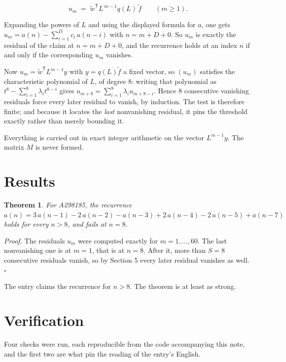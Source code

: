 \documentclass[11pt]{article}
\newtheorem{theorem}{Theorem}
\theoremstyle{definition}
\begin{document}
\[u_m \;=\; \tilde w^{\mathsf T} L^{\,m-1} q(L)\,\tilde f \qquad (m \ge 1).\]

Expanding the powers of $L$ and using the displayed formula for $a$, one gets $u_m = a(n) - \sum_{i=1}^{D} c_i\,a(n-i)$ with $n = m + D + 0$. So $u_m$ is exactly the residual of the claim at $n = m + D + 0$, and the recurrence holds at an index $n$ if and only if the corresponding $u_m$ vanishes.

Now $u_m = \tilde w^{\mathsf T} L^{m-1} y$ with $y = q(L)\tilde f$ a fixed vector, so $(u_m)$ satisfies the characteristic polynomial of $L$, of degree $8$: writing that polynomial as $t^{8} - \sum_{i=1}^{8} \lambda_i t^{8-i}$ gives $u_{m+8} = \sum_{i=1}^{8} \lambda_i u_{m+8-i}$. Hence $8$ consecutive vanishing residuals force every later residual to vanish, by induction. The test is therefore finite; and because it locates the {\itshape last} nonvanishing residual, it pins the threshold exactly rather than merely bounding it.

Everything is carried out in exact integer arithmetic on the vector $L^{m-1}y$. The matrix $M$ is never formed.

\section{Results}

\begin{theorem} For A298185, the recurrence $a(n) = 3\,a(n-1) - 2\,a(n-2) - a(n-3) + 2\,a(n-4) - 2\,a(n-5) + a(n-7)$ holds for every $n > 8$, and fails at $n = 8$.\end{theorem}

{\itshape Proof.} The residuals $u_m$ were computed exactly for $m = 1,\dots,60$. The last nonvanishing one is at $m = 1$, that is at $n = 8$. After it, more than $S = 8$ consecutive residuals vanish, so by Section 5 every later residual vanishes as well. $\square$

The entry claims the recurrence for $n > 8$. The theorem is at least as strong.

\section{Verification}

Four checks were run, each reproducible from the code accompanying this note, and the first two are what pin the reading of the entry's English.
\end{document}
